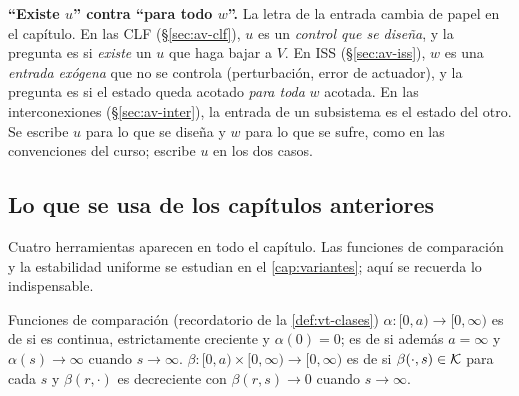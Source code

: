 
\begin{ideaclave}
\textbf{``Existe $u$'' contra ``para todo $w$''.} La letra de la entrada cambia de papel en el capítulo. En las CLF (\S\ref{sec:av-clf}), $u$ es un \emph{control que se diseña}, y la pregunta es si \emph{existe} un $u$ que haga bajar a $V$. En ISS (\S\ref{sec:av-iss}), $w$ es una \emph{entrada exógena} que no se controla (perturbación, error de actuador), y la pregunta es si el estado queda acotado \emph{para toda} $w$ acotada. En las interconexiones (\S\ref{sec:av-inter}), la entrada de un subsistema es el estado del otro. Se escribe $u$ para lo que se diseña y $w$ para lo que se sufre, como en las convenciones del curso; \citet{Kha02} escribe $u$ en los dos casos.
\end{ideaclave}

\subsection*{Lo que se usa de los capítulos anteriores}

Cuatro herramientas aparecen en todo el capítulo. Las funciones de comparación y la estabilidad uniforme se estudian en el \cref{cap:variantes}; aquí se recuerda lo indispensable.

\begin{definicion}[label=def:av-comparacion]{Funciones de comparación (recordatorio de la \cref{def:vt-clases})}
$\alpha:[0,a)\to[0,\infty)$ es de  si es continua, estrictamente creciente y $\alpha(0)=0$; es de  si además $a=\infty$ y $\alpha(s)\to\infty$ cuando $s\to\infty$. $\beta:[0,a)\times[0,\infty)\to[0,\infty)$ es de  si $\beta(\cdot,s)\in\mathcal{K}$ para cada $s$ y $\beta(r,\cdot)$ es decreciente con $\beta(r,s)\to0$ cuando $s\to\infty$.
\end{definicion}

